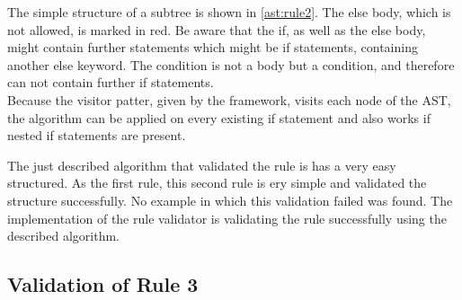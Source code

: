 The simple structure of a subtree is shown in \ref{ast:rule2}. The else body, which is not allowed, is marked in red. 
Be aware that the if, as well as the else body, might contain further statements which might be if statements, containing another else keyword. The condition is not a body but a condition, and therefore can not contain further if statements.
\\

Because the visitor patter, given by the framework, visits each node of the \acf{AST}, the algorithm can be applied on every existing if statement and also works if nested if statements are present.
\\

\label{ast:rule2}

The just described algorithm that validated the rule is has a very easy structured. As the first rule, this second rule is ery simple and validated the structure successfully. No example in which this validation failed was found. The implementation of the rule validator is validating the rule successfully using the described algorithm.

\subsection*{Validation of Rule 3}


